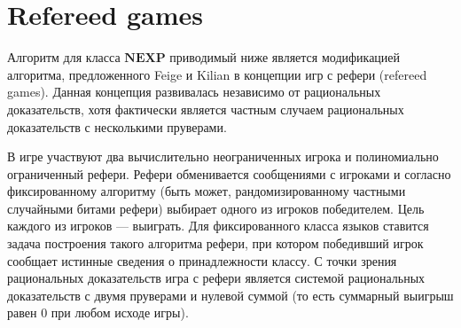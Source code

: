 \documentclass{mipt-thesis-bs}
\theoremstyle{plain}
\theoremstyle{definition}
\begin{document}
\section{Refereed games}
Алгоритм для класса $\textbf{NEXP}$ приводимый ниже является модификацией алгоритма, предложенного Feige и Kilian \cite{feige1997refereed} в концепции игр с рефери (refereed games). Данная концепция развивалась независимо от рациональных доказательств, хотя фактически является частным случаем рациональных доказательств с несколькими пруверами.

В игре участвуют два вычислительно неограниченных игрока и полиномиально ограниченный рефери. Рефери обменивается сообщениями с игроками и согласно фиксированному алгоритму (быть может, рандомизированному частными случайными битами рефери) выбирает одного из игроков победителем. Цель каждого из игроков --- выиграть. Для фиксированного класса языков ставится задача построения такого алгоритма рефери, при котором победивший игрок сообщает истинные сведения о принадлежности классу. С точки зрения рациональных доказательств игра с рефери является системой рациональных доказательств с двумя пруверами и нулевой суммой (то есть суммарный выигрыш равен $0$ при любом исходе игры).
\end{document}
